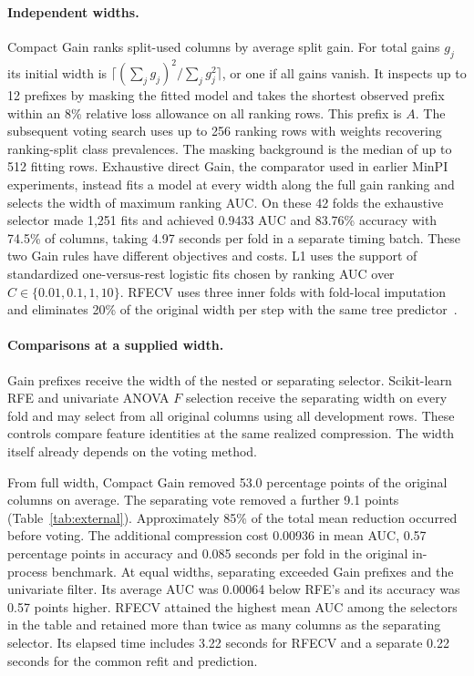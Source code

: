 \paragraph{Independent widths.}
Compact Gain ranks split-used columns by average split gain. For total gains $g_j$ its initial width is $\lceil(\sum_jg_j)^2/\sum_jg_j^2\rceil$, or one if all gains vanish. It inspects up to 12 prefixes by masking the fitted model and takes the shortest observed prefix within an 8\% relative loss allowance on all ranking rows. This prefix is $A$. The subsequent voting search uses up to 256 ranking rows with weights recovering ranking-split class prevalences. The masking background is the median of up to 512 fitting rows. Exhaustive direct Gain, the comparator used in earlier MinPI experiments, instead fits a model at every width along the full gain ranking and selects the width of maximum ranking AUC. On these 42 folds the exhaustive selector made 1,251 fits and achieved 0.9433 AUC and 83.76\% accuracy with 74.5\% of columns, taking 4.97 seconds per fold in a separate timing batch. These two Gain rules have different objectives and costs. L1 uses the support of standardized one-versus-rest logistic fits chosen by ranking AUC over $C\in\{0.01,0.1,1,10\}$. RFECV uses three inner folds with fold-local imputation and eliminates 20\% of the original width per step with the same tree predictor~\cite{guyon2002rfe,pedregosa2011sklearn}.

\paragraph{Comparisons at a supplied width.}
Gain prefixes receive the width of the nested or separating selector. Scikit-learn RFE and univariate ANOVA $F$ selection receive the separating width on every fold and may select from all original columns using all development rows. These controls compare feature identities at the same realized compression. The width itself already depends on the voting method.


From full width, Compact Gain removed 53.0 percentage points of the original columns on average. The separating vote removed a further 9.1 points (Table~\ref{tab:external}). Approximately 85\% of the total mean reduction occurred before voting. The additional compression cost 0.00936 in mean AUC, 0.57 percentage points in accuracy and 0.085 seconds per fold in the original in-process benchmark. At equal widths, separating exceeded Gain prefixes and the univariate filter. Its average AUC was 0.00064 below RFE's and its accuracy was 0.57 points higher. RFECV attained the highest mean AUC among the selectors in the table and retained more than twice as many columns as the separating selector. Its elapsed time includes 3.22 seconds for RFECV and a separate 0.22 seconds for the common refit and prediction.

